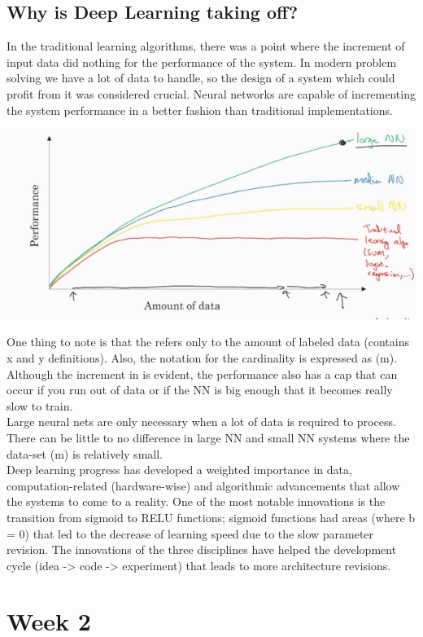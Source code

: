 \documentclass[11pt]{report}
\begin{document}
\subsection{Why is Deep Learning taking off?}
In the traditional learning algorithms, there was a point where the increment of input data did nothing for the performance of the system. In modern problem solving we have a lot of data to handle, so the design of a system which could profit from it was considered crucial. Neural networks are capable of incrementing the system performance in a better fashion than traditional implementations. 
\begin{center}
	\includegraphics[width = .50\textwidth]{PRGR.png}
\end{center}
One thing to note is that the  refers only to the amount of labeled data (contains x and y definitions). Also, the notation for the cardinality is expressed as (m).\\
Although the increment in  is evident, the performance also has a cap that can occur if you run out of data or if the NN is big enough that it becomes really slow to train.\\
Large neural nets are only necessary when a lot of data is required to process. There can be little to no difference in large NN and small NN systems where the data-set (m) is relatively small.\\
Deep learning progress has developed a weighted importance in data, computation-related (hardware-wise) and algorithmic advancements that allow the systems to come to a reality. One of the most notable innovations is the transition from sigmoid to RELU functions; sigmoid functions had areas (where b = 0) that led to the decrease of learning speed due to the slow parameter revision. The innovations of the three disciplines have helped the development cycle (idea -> code -> experiment) that leads to more architecture revisions.

\section{Week 2}
\end{document}
